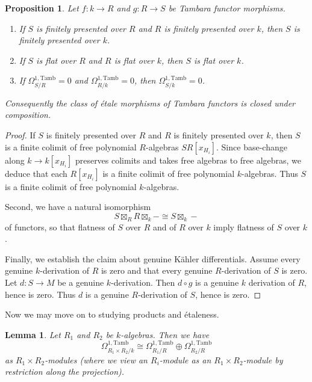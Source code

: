 \documentclass[11pt,dvipsnames]{amsart}
\newtheorem{lemma}[theorem]{Lemma}
\newtheorem{proposition}[theorem]{Proposition}
\theoremstyle{BoldRemark}
\newcommand{\Tamb}{\mathrm{Tamb}}
\begin{document}
\begin{proposition}\label{prop:etale-preserved-under-comp}
    Let $f : k \rightarrow R$ and $g : R \rightarrow S$ be Tambara functor morphisms.
    \begin{enumerate}
        \item If $S$ is finitely presented over $R$ and $R$ is finitely presented over $k$, then $S$ is finitely presented over $k$.
        \item If $S$ is flat over $R$ and $R$ is flat over $k$, then $S$ is flat over $k$.
        \item If $\Omega^{1,\Tamb}_{S/R} = 0$ and $\Omega^{1,\Tamb}_{R/k} = 0$, then $\Omega^{1,\Tamb}_{S/k} = 0$.
    \end{enumerate}
    Consequently the class of \'{e}tale morphisms of Tambara functors is closed under composition.
\end{proposition}

\begin{proof}
    If $S$ is finitely presented over $R$ and $R$ is finitely presented over $k$, then $S$ is a finite colimit of free polynomial $R$-algebras $SR[x_{H_i}]$. Since base-change along $k \rightarrow k[x_{H_i}]$ preserves colimits and takes free algebras to free algebras, we deduce that each $R[x_{H_i}]$ is a finite colimit of free polynomial $k$-algebras. Thus $S$ is a finite colimit of free polynomial $k$-algebras.

    Second, we have a natural isomorphism 
    \[ 
        S \boxtimes_R R \boxtimes_k - \cong S \boxtimes_k - 
    \] 
    of functors, so that flatness of $S$ over $R$ and of $R$ over $k$ imply flatness of $S$ over $k$.
    
    Finally, we establish the claim about genuine K\"{a}hler differentials. Assume every genuine $k$-derivation of $R$ is zero and that every genuine $R$-derivation of $S$ is zero. Let $d : S \rightarrow M$ be a genuine $k$-derivation. Then $d \circ g$ is a genuine $k$ derivation of $R$, hence is zero. Thus $d$ is a genuine $R$-derivation of $S$, hence is zero.
\end{proof}

Now we may move on to studying products and \'{e}taleness.

\begin{lemma}\label{lem:genuine-differentials-of-product}
	Let $R_1$ and $R_2$ be $k$-algebras. Then we have 
    \[ 
        \Omega^{1, \Tamb}_{R_1 \times R_2/k} \cong \Omega^{1, \Tamb}_{R_1/R} \oplus \Omega^{1, \Tamb}_{R_2/R} 
    \] 
    as $R_1 \times R_2$-modules (where we view an $R_i$-module as an $R_1 \times R_2$-module by restriction along the projection).
\end{lemma}
\end{document}
